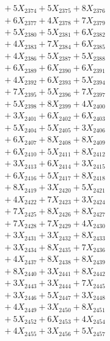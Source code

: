 \documentclass[a4paper,10pt]{article}
\begin{document}
{\begin{align}
&\;  + 5 X_{2374} + 5 X_{2375} + 8 X_{2376} \\[0.3ex]
&\;  + 6 X_{2377} + 4 X_{2378} + 7 X_{2379} \\[0.5ex]\allowbreak
&\;  + 5 X_{2380} + 5 X_{2381} + 6 X_{2382} \\[0.3ex]
&\;  + 4 X_{2383} + 7 X_{2384} + 6 X_{2385} \\[0.3ex]
&\;  + 4 X_{2386} + 5 X_{2387} + 5 X_{2388} \\[0.3ex]
&\;  + 6 X_{2389} + 6 X_{2390} + 6 X_{2391} \\[0.3ex]
&\;  + 4 X_{2392} + 6 X_{2393} + 5 X_{2394} \\[0.3ex]
&\;  + 7 X_{2395} + 5 X_{2396} + 7 X_{2397} \\[0.3ex]
&\;  + 5 X_{2398} + 8 X_{2399} + 4 X_{2400} \\[0.3ex]
&\;  + 3 X_{2401} + 6 X_{2402} + 6 X_{2403} \\[0.3ex]
&\;  + 5 X_{2404} + 5 X_{2405} + 3 X_{2406} \\[0.3ex]
&\;  + 6 X_{2407} + 8 X_{2408} + 8 X_{2409} \\[0.5ex]\allowbreak
&\;  + 6 X_{2410} + 5 X_{2411} + 8 X_{2412} \\[0.3ex]
&\;  + 3 X_{2413} + 6 X_{2414} + 3 X_{2415} \\[0.3ex]
&\;  + 6 X_{2416} + 5 X_{2417} + 8 X_{2418} \\[0.3ex]
&\;  + 8 X_{2419} + 3 X_{2420} + 5 X_{2421} \\[0.3ex]
&\;  + 4 X_{2422} + 7 X_{2423} + 3 X_{2424} \\[0.3ex]
&\;  + 7 X_{2425} + 8 X_{2426} + 8 X_{2427} \\[0.3ex]
&\;  + 7 X_{2428} + 7 X_{2429} + 4 X_{2430} \\[0.3ex]
&\;  + 3 X_{2431} + 3 X_{2432} + 8 X_{2433} \\[0.3ex]
&\;  + 3 X_{2434} + 8 X_{2435} + 7 X_{2436} \\[0.3ex]
&\;  + 4 X_{2437} + 8 X_{2438} + 8 X_{2439} \\[0.5ex]\allowbreak
&\;  + 8 X_{2440} + 3 X_{2441} + 8 X_{2442} \\[0.3ex]
&\;  + 3 X_{2443} + 3 X_{2444} + 7 X_{2445} \\[0.3ex]
&\;  + 3 X_{2446} + 5 X_{2447} + 3 X_{2448} \\[0.3ex]
&\;  + 4 X_{2449} + 3 X_{2450} + 8 X_{2451} \\[0.3ex]
&\;  + 5 X_{2452} + 6 X_{2453} + 4 X_{2454} \\[0.3ex]
&\;  + 4 X_{2455} + 3 X_{2456} + 5 X_{2457} \\[0.3ex]

\end{align}}
\end{document}
